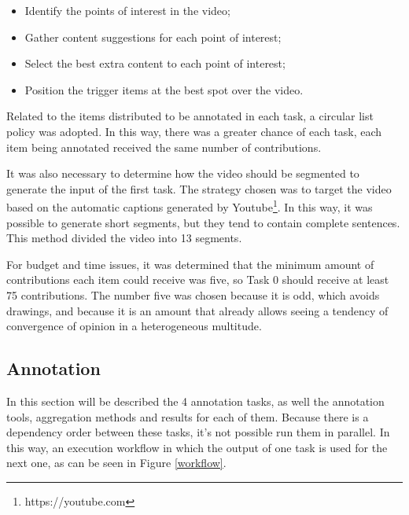 \begin{itemize}
\item Identify the points of interest in the video; 
\item Gather content suggestions for each point of interest; 
\item Select the best extra content to each point of interest;
\item Position the trigger items at the best spot over the video. 
\end{itemize}

Related to the items distributed to be annotated in each task, a circular list policy was adopted. In this way, there was a greater chance of each task, each item being annotated received the same number of contributions.

It was also necessary to determine how the video should be segmented to generate the input of the first task. The strategy chosen was to target the video based on the automatic captions generated by Youtube\footnote{https://youtube.com}. In this way, it was possible to generate short segments, but they tend to contain complete sentences. This method divided the video into 13 segments.

For budget and time issues, it was determined that the minimum amount of contributions each item could receive was five, so Task 0 should receive at least 75 contributions. The number five was chosen because it is odd, which avoids drawings, and because it is an amount that already allows seeing a tendency of convergence of opinion in a heterogeneous multitude.



\subsection{Annotation}
In this section will be described the 4 annotation tasks, as well the annotation tools, aggregation methods and results for each of them. Because there is a dependency order between these tasks, it's not possible run them in parallel. In this way, an execution workflow in which the output of one task is used for the next one, as can be seen in Figure \ref{workflow}.

